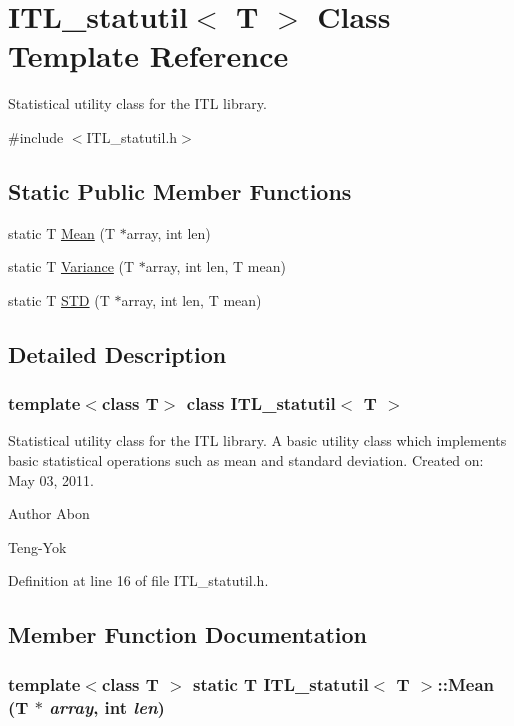 \hypertarget{classITL__statutil}{
\section{ITL\_\-statutil$<$ T $>$ Class Template Reference}
\label{classITL__statutil}
}


Statistical utility class for the ITL library.  




{\ttfamily \#include $<$ITL\_\-statutil.h$>$}

\subsection*{Static Public Member Functions}
\begin{DoxyCompactItemize}
\item 
static T \hyperlink{classITL__statutil_aafc7010678516b38cc864053dffd7370}{Mean} (T $\ast$array, int len)
\item 
static T \hyperlink{classITL__statutil_a9fdf5ab88e10c73216e9ca17e8edc119}{Variance} (T $\ast$array, int len, T mean)
\item 
static T \hyperlink{classITL__statutil_a1b511d9668163f4ebb8c6005b3d1a874}{STD} (T $\ast$array, int len, T mean)
\end{DoxyCompactItemize}


\subsection{Detailed Description}
\subsubsection*{template$<$class T$>$ class ITL\_\-statutil$<$ T $>$}

Statistical utility class for the ITL library. A basic utility class which implements basic statistical operations such as mean and standard deviation. Created on: May 03, 2011. \begin{DoxyAuthor}{Author}
Abon 

Teng-\/Yok 
\end{DoxyAuthor}


Definition at line 16 of file ITL\_\-statutil.h.



\subsection{Member Function Documentation}
\hypertarget{classITL__statutil_aafc7010678516b38cc864053dffd7370}{
\subsubsection[{Mean}]{\setlength{\rightskip}{0pt plus 5cm}template$<$class T $>$ static T {\bf ITL\_\-statutil}$<$ T $>$::Mean (T $\ast$ {\em array}, \/  int {\em len})}}
\label{classITL__statutil_aafc7010678516b38cc864053dffd7370}


